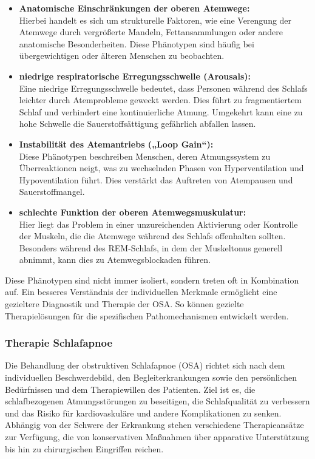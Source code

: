 \documentclass[a4paper, 12pt]{article}
\begin{document}
\begin{itemize}
\item \textbf{Anatomische Einschränkungen der oberen Atemwege:}\\
Hierbei handelt es sich um strukturelle Faktoren, wie eine Verengung der Atemwege durch vergrößerte Mandeln, Fettansammlungen oder andere anatomische Besonderheiten. Diese Phänotypen sind häufig bei übergewichtigen oder älteren Menschen zu beobachten.

\item \textbf{niedrige respiratorische Erregungsschwelle (Arousals):}\\
Eine niedrige Erregungsschwelle bedeutet, dass Personen während des Schlafs leichter durch Atemprobleme geweckt werden. Dies führt zu fragmentiertem Schlaf und verhindert eine kontinuierliche Atmung. Umgekehrt kann eine zu hohe Schwelle die Sauerstoffsättigung gefährlich abfallen lassen.

\item \textbf{Instabilität des Atemantriebs („Loop Gain“):}\\
Diese Phänotypen beschreiben Menschen, deren Atmungssystem zu Überreaktionen neigt, was zu wechselnden Phasen von Hyperventilation und Hypoventilation führt. Dies verstärkt das Auftreten von Atempausen und Sauerstoffmangel.

\item \textbf{schlechte Funktion der oberen Atemwegsmuskulatur:}\\
Hier liegt das Problem in einer unzureichenden Aktivierung oder Kontrolle der Muskeln, die die Atemwege während des Schlafs offenhalten sollten. Besonders während des REM-Schlafs, in dem der Muskeltonus generell abnimmt, kann dies zu Atemwegsblockaden führen.
\end{itemize}
Diese Phänotypen sind nicht immer isoliert, sondern treten oft in Kombination auf. Ein besseres Verständnis der individuellen Merkmale ermöglicht eine gezieltere Diagnostik und Therapie der OSA. So können gezielte Therapielösungen für die spezifischen Pathomechanismen entwickelt werden. 
\cite{OSA_Pathophysiology2019} \cite{DGSM2017}

\subsubsection{Therapie Schlafapnoe}\label{therapy}

Die Behandlung der obstruktiven Schlafapnoe (OSA) richtet sich nach dem individuellen Beschwerdebild, den Begleiterkrankungen sowie den persönlichen Bedürfnissen und dem Therapiewillen des Patienten. Ziel ist es, die schlafbezogenen Atmungsstörungen zu beseitigen, die Schlafqualität zu verbessern und das Risiko für kardiovaskuläre und andere Komplikationen zu senken. Abhängig von der Schwere der Erkrankung stehen verschiedene Therapieansätze zur Verfügung, die von konservativen Maßnahmen über apparative Unterstützung bis hin zu chirurgischen Eingriffen reichen. \cite{DAE81892} \cite{flexikon}
\end{document}
